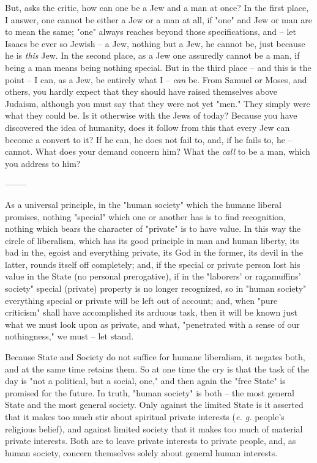 But, asks the critic, how can one be a Jew and a man at once? In the first 
place, I answer, one cannot be either a Jew or a man at all, if "{}one"{} and 
Jew or man are to mean the same; "{}one"{} always reaches beyond those 
specifications, and -- let Isaacs be ever so Jewish -- a Jew, nothing but a 
Jew, he cannot be, just because he is \textit{this} Jew. In the second place, 
as a Jew one assuredly cannot be a man, if being a man means being nothing 
special. But in the third place -- and this is the point -- I can, as a Jew, 
be entirely what I -- \textit{can} be. From Samuel or Moses, and others, you 
hardly expect that they should have raised themselves above Judaism, although 
you must say that they were not yet "{}men."{} They simply were what they 
could be. Is it otherwise with the Jews of today? Because you have discovered 
the idea of humanity, does it follow from this that every Jew can become a 
convert to it? If he can, he does not fail to, and, if he fails to, he -- 
cannot. What does your demand concern him? What the \textit{call} to be a man, 
which you address to him?

\begin{center}
--------\end{center}


As a universal principle, in the "{}human society"{} which the humane liberal 
promises, nothing "{}special"{} which one or another has is to find 
recognition, nothing which bears the character of "{}private"{} is to have 
value. In this way the circle of liberalism, which has its good principle in 
man and human liberty, its bad in the, egoist and everything private, its God 
in the former, its devil in the latter, rounds itself off completely; and, if 
the special or private person lost his value in the State (no personal 
prerogative), if in the "{}laborers' or ragamuffins' society"{} special 
(private) property is no longer recognized, so in "{}human society"{} 
everything special or private will be left out of account; and, when "{}pure 
criticism"{} shall have accomplished its arduous task, then it will be known 
just what we must look upon as private, and what, "{}penetrated with a sense 
of our nothingness,"{} we must -- let stand.

Because State and Society do not suffice for humane liberalism, it negates 
both, and at the same time retains them. So at one time the cry is that the 
task of the day is "{}not a political, but a social, one,"{} and then again 
the "{}free State"{} is promised for the future. In truth, "{}human society"{} 
is both -- the most general State and the most general society. Only against 
the limited State is it asserted that it makes too much stir about spiritual 
private interests (\textit{e. g.} people's religious belief), and against 
limited society that it makes too much of material private interests. Both are 
to leave private interests to private people, and, as human society, concern 
themselves solely about general human interests.

